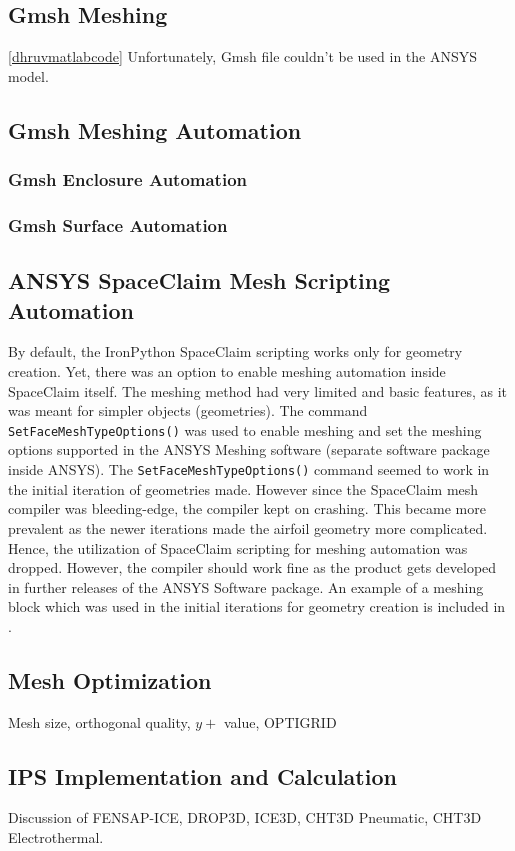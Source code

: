 \documentclass[english]{kththesis}
\begin{document}
\subsection{Gmsh Meshing} \ref{dhruvmatlabcode} Unfortunately, Gmsh file couldn't be used in the ANSYS model.
\subsection{Gmsh Meshing Automation} \label{subsec:gmsh_mesh}
\subsubsection{Gmsh Enclosure Automation}
\subsubsection{Gmsh Surface Automation}
\subsection{ANSYS SpaceClaim Mesh Scripting Automation}
By default, the IronPython SpaceClaim scripting works only for geometry creation. Yet, there was an option to enable meshing automation inside SpaceClaim itself. The meshing method had very limited and basic features, as it was meant for simpler objects (geometries). The command \lstinline{SetFaceMeshTypeOptions()} was used to enable meshing and set the meshing options supported in the ANSYS Meshing software (separate software package inside ANSYS). The \lstinline{SetFaceMeshTypeOptions()} command seemed to work in the initial iteration of geometries made. However since the SpaceClaim mesh compiler was bleeding-edge, the compiler kept on crashing. This became more prevalent as the newer iterations made the airfoil geometry more complicated. Hence, the utilization of SpaceClaim scripting for meshing automation was dropped. However, the compiler should work fine as the product gets developed in further releases of the ANSYS Software package. An example of a meshing block which was used in the initial iterations for geometry creation is included in . 

\subsection{Mesh Optimization} Mesh size, orthogonal quality, $y+$ value, OPTIGRID

\subsection{IPS Implementation and Calculation}
Discussion of FENSAP-ICE, DROP3D, ICE3D, CHT3D Pneumatic, CHT3D Electrothermal.
\end{document}
